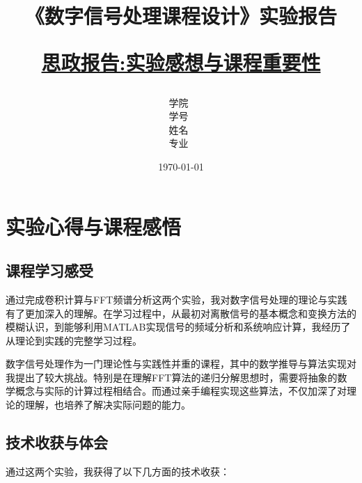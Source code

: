 \documentclass[12pt,hyperref,a4paper,UTF8]{ctexart}
\title{ 
        \vspace{1cm}
        \heiti \Huge \textbf{《数字信号处理课程设计》实验报告} \par
        \vspace{1cm} 
        \heiti \Large {\underline{思政报告:实验感想与课程重要性}   } 
        \vspace{3cm}
    
    }
\author{
        \vspace{0.5cm}
        \kaishu\Large 学院\ \dlmu[9cm]{卓越学院} \\ %
        \vspace{0.5cm}
        \kaishu\Large 学号\ \dlmu[9cm]{23040447} \\ %
        \vspace{0.5cm}
        \kaishu\Large 姓名\ \dlmu[9cm]{陈文轩} \qquad  \\ %
        \vspace{0.5cm}
        \kaishu\Large 专业\ \dlmu[9cm]{智能硬件与系统(电子信息工程)} \qquad \\ %
    }
\date{\today} %
\begin{document}
\cover
\thispagestyle{empty} %







\newpage
\setcounter{page}{1} %

\section{实验心得与课程感悟}

\subsection{课程学习感受}

通过完成卷积计算与FFT频谱分析这两个实验，我对数字信号处理的理论与实践有了更加深入的理解。在学习过程中，从最初对离散信号的基本概念和变换方法的模糊认识，到能够利用MATLAB实现信号的频域分析和系统响应计算，我经历了从理论到实践的完整学习过程。

数字信号处理作为一门理论性与实践性并重的课程，其中的数学推导与算法实现对我提出了较大挑战。特别是在理解FFT算法的递归分解思想时，需要将抽象的数学概念与实际的计算过程相结合。而通过亲手编程实现这些算法，不仅加深了对理论的理解，也培养了解决实际问题的能力。

\subsection{技术收获与体会}

通过这两个实验，我获得了以下几方面的技术收获：
\end{document}
